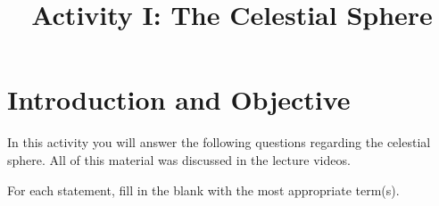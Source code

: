 \documentclass[12pt]{article}
\begin{document}
\title{Activity I: The Celestial Sphere}

\maketitle


\section {Introduction and Objective}

In this activity you will answer the following questions regarding the celestial
sphere. All of this material was discussed in the lecture videos.\newline


For each statement, fill in the blank with the most appropriate term(s).\newline
\end{document}
